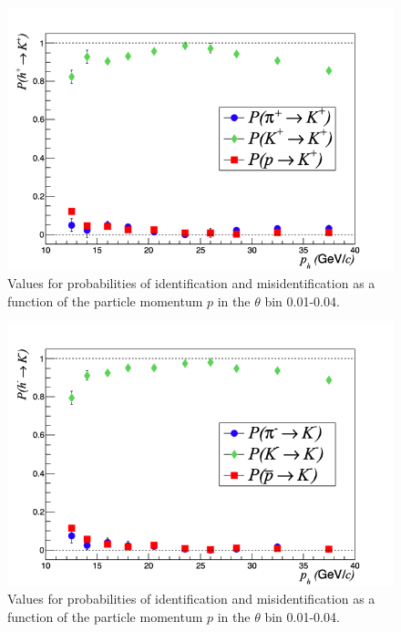 \documentclass[letterpaper,12pt]{article}
\begin{document}
\begin{figure}[p!]
	\centering
	\includegraphics[scale=0.1]{./gfx/RICHPlus.png}
	\caption{Values for probabilities of identification and misidentification as a function of the particle momentum $p$ in the $\theta$ bin 0.01-0.04.}
	\label{RICH_Efficiencies_P}
\end{figure}

\begin{figure}[p!]
	\centering
	\includegraphics[scale=0.1]{./gfx/RICHMinus.png}
	\caption{Values for probabilities of identification and misidentification as a function of the particle momentum $p$ in the $\theta$ bin 0.01-0.04.}
	\label{RICH_Efficiencies_M}
\end{figure}
\end{document}
